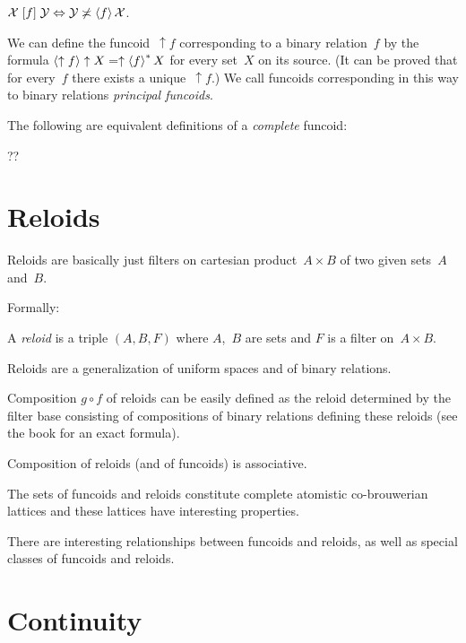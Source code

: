 \documentclass{amsart}
\begin{document}
\begin{defn}
$\mathcal{X}\mathrel{\left[f\right]}\mathcal{Y} \Leftrightarrow \mathcal{Y}\not\asymp\left\langle f\right\rangle\mathcal{X}$.
\end{defn}

We can define the funcoid~$\uparrow f$ corresponding to a binary relation~$f$ by the formula $\left\langle \uparrow f\right\rangle\uparrow X=\uparrow\left\langle f\right\rangle ^{\ast}X$ for every set~$X$ on its source. (It can be proved that for every~$f$ there exists a unique~$\uparrow f$.) We call funcoids corresponding in this way to binary relations \emph{principal funcoids}.

The following are equivalent definitions of a \emph{complete} funcoid:

??

\section{Reloids}

Reloids are basically just filters on cartesian product~$A\times B$ of two given sets~$A$ and~$B$.

Formally:

\begin{defn}
A \emph{reloid} is a triple $(A,B,F)$ where $A$,~$B$ are sets and $F$ is a filter on~$A\times B$.
\end{defn}

Reloids are a generalization of uniform spaces and of binary relations.

\begin{defn}
Composition $g\circ f$ of reloids can be easily defined as the reloid determined by the filter base
consisting of compositions of binary relations defining these reloids (see the book for an exact formula).
\end{defn}

\begin{prop}
Composition of reloids (and of funcoids) is associative.
\end{prop}

The sets of funcoids and reloids constitute complete atomistic co-brouwerian lattices and these lattices have interesting
properties.

There are interesting relationships between funcoids and reloids, as well as special classes of funcoids and reloids.

\section{Continuity}
\end{document}
